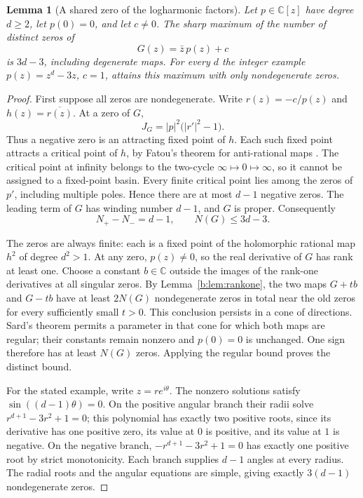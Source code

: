 \documentclass[UTF8,11pt]{ctexart}
\newtheorem{lem}[thm]{Lemma}
\theoremstyle{definition}
\numberwithin{equation}{section}
\newcommand{\C}{\mathbb C}\newcommand{\R}{\mathbb R}
\begin{document}
\begin{lem}[A shared zero of the logharmonic factors]
\label{v23:lem:sharedzero}
Let $p\in\C[z]$ have degree $d\ge2$, let $p(0)=0$, and let
$c\ne0$. The sharp maximum of the number of distinct zeros of
\[
                         G(z)=\bar z\,p(z)+c
\]
is $3d-3$, including degenerate maps. For every $d$ the integer
example $p(z)=z^d-3z$, $c=1$, attains this maximum with only
nondegenerate zeros.
\end{lem}
\begin{proof}
First suppose all zeros are nondegenerate. Write
$r(z)=-c/p(z)$ and $h(z)=\overline{r(z)}$. At a zero of $G$,
\[
 J_G=|p|^2\bigl(|r'|^2-1\bigr).
\]
Thus a negative zero is an attracting fixed point of $h$.
Each such fixed point attracts a critical point of $h$, by Fatou's
theorem for anti-rational maps
\cite[Lemma~2.1, \av, p.~5]{KLP24}.
The critical point at infinity belongs to the two-cycle
$\infty\mapsto0\mapsto\infty$, so it cannot be assigned to a
fixed-point basin. Every finite critical point lies among the
zeros of $p'$, including multiple poles. Hence there are at most
$d-1$ negative zeros. The leading term of $G$ has winding number
$d-1$, and $G$ is proper. Consequently
\[
                  N_+-N_-=d-1,\qquad N(G)\le3d-3.
\]

The zeros are always finite: each is a fixed point of the
holomorphic rational map $h^2$ of degree $d^2>1$.
At any zero, $p(z)\ne0$, so the real derivative of $G$ has rank
at least one. Choose a constant $b\in\C$ outside the images of
the rank-one derivatives at all singular zeros. By
Lemma~\ref{b:lem:rankone}, the two maps $G+tb$ and $G-tb$
have at least $2N(G)$ nondegenerate zeros in total near the old
zeros for every sufficiently small $t>0$. This conclusion persists
in a cone of directions. Sard's theorem permits a parameter in
that cone for which both maps are regular; their constants remain
nonzero and $p(0)=0$ is unchanged. One sign therefore has at least
$N(G)$ zeros. Applying the regular bound proves the distinct bound.

For the stated example, write $z=re^{i\theta}$. The nonzero
solutions satisfy $\sin((d-1)\theta)=0$. On the positive angular
branch their radii solve
$r^{d+1}-3r^2+1=0$; this polynomial has exactly two positive
roots, since its derivative has one positive zero, its value at
$0$ is positive, and its value at $1$ is negative. On the negative
branch, $-r^{d+1}-3r^2+1=0$ has exactly one positive root by
strict monotonicity. Each branch supplies $d-1$ angles at every
radius. The radial roots and the angular equations are simple,
giving exactly $3(d-1)$ nondegenerate zeros.
\end{proof}
\end{document}
